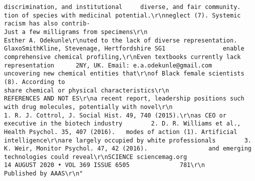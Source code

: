 \documentclass[
]{book}
\begin{document}
\begin{verbatim}
discrimination, and institutional     diverse, and fair community.                                 tion of species with medicinal potential.\r\nneglect (7). Systemic racism has also contrib-                                                                 Just a few milligrams from specimens\r\n                                                  Esther A. Odekunle\r\nuted to the lack of diverse representation.       GlaxoSmithKline, Stevenage, Hertfordshire SG1                enable comprehensive chemical profiling,\r\nEven textbooks currently lack representation      2NY, UK. Email: e.a.odekunle@gmail.com                       uncovering new chemical entities that\r\nof Black female scientists (8). According to                                                                   share chemical or physical characteristics\r\n                                                  REFERENCES AND NOT ES\r\na recent report, leadership positions such                                                                     with drug molecules, potentially with novel\r\n                                                   1. R. J. Cottrol, J. Social Hist. 49, 740 (2015).\r\nas CEO or executive in the biotech industry        2. D. R. Williams et al., Health Psychol. 35, 407 (2016).   modes of action (1). Artificial intelligence\r\nare largely occupied by white professionals        3. K. Weir, Monitor Psychol. 47, 42 (2016).                 and emerging technologies could reveal\r\nSCIENCE sciencemag.org                                                                                               14 AUGUST 2020 • VOL 369 ISSUE 6505              781\r\n                                                                      Published by AAAS\r\n"

\end{verbatim}
\end{document}
